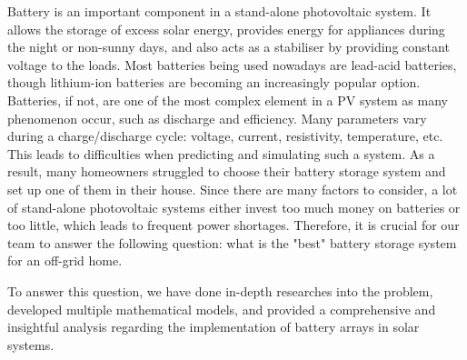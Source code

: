 Battery is an important component in a stand-alone photovoltaic system. It allows the storage of excess solar energy, provides energy for appliances during the night or non-sunny days, and also acts as a stabiliser by providing constant voltage to the loads. Most batteries being used nowadays are lead-acid batteries, though lithium-ion batteries are becoming an increasingly popular option. Batteries, if not, are one of the most complex element in a PV system as many phenomenon occur, such as discharge and efficiency. Many parameters vary during a charge/discharge cycle: voltage, current, resistivity, temperature, etc. This leads to difficulties when predicting and simulating such a system. As a result, many homeowners struggled to choose their battery storage system and set up one of them in their house. Since there are many factors to consider, a lot of stand-alone photovoltaic systems either invest too much money on batteries or too little, which leads to frequent power shortages. Therefore, it is crucial for our team to answer the following question: what is the "best" battery storage system for an off-grid home.

To answer this question, we have done in-depth researches into the problem, developed multiple mathematical models, and provided a comprehensive and insightful analysis regarding the implementation of battery arrays in solar systems.
